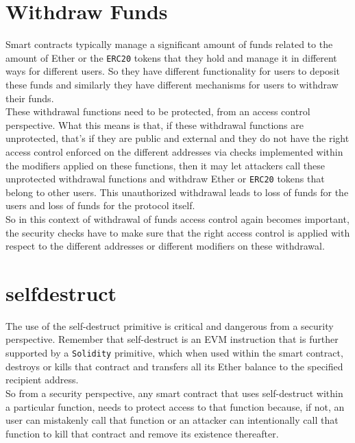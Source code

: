 \section{Withdraw Funds}

Smart contracts typically manage a significant amount of funds related to the amount of Ether or the \texttt{ERC20} tokens that they hold and manage it in different ways for different users. So they have different functionality for users to deposit these funds and similarly they have different mechanisms for users to withdraw their funds.\\

These withdrawal functions need to be protected, from an access control perspective. What this means is that, if these withdrawal functions are unprotected, that's if they are public and external and they do not have the right access control enforced on the different addresses via checks implemented within the modifiers applied on these functions, then it may let attackers call these unprotected withdrawal functions and withdraw Ether or \texttt{ERC20} tokens that belong to other users. This unauthorized withdrawal leads to loss of funds for the users and loss of funds for the protocol itself.\\

So in this context of withdrawal of funds access control again becomes important, the security checks have to make sure that the right access control is applied with respect to the different addresses or different modifiers on these withdrawal.

\section{selfdestruct}

The use of the self-destruct primitive is critical and dangerous from a security perspective. Remember that self-destruct is an EVM instruction that is further supported by a \texttt{Solidity} primitive, which when used within the smart contract, destroys or kills that contract and transfers all its Ether balance to the specified recipient address.\\

So from a security perspective, any smart contract that uses self-destruct within a particular function, needs to protect access to that function because, if not, an user can mistakenly call that function or an attacker can intentionally call that function to kill that contract and remove its existence thereafter.\\ 

